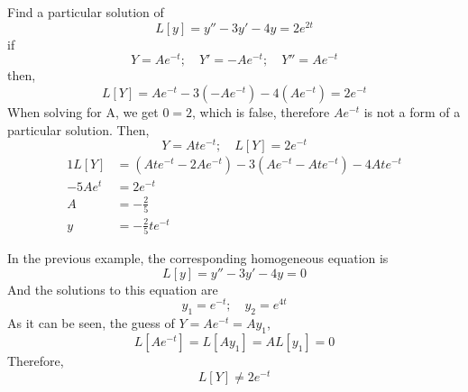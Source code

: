\documentclass[diffeq.tex]{subfiles}
\begin{document}
    \np
    \begin{example}
        Find a particular solution of
        \begin{equation}
            L[y] = y''- 3y' - 4y = 2e^{2t}
        \end{equation}
        if
        \begin{equation}
            Y = Ae^{-t};\quad Y' = -Ae^{-t};\quad Y'' = Ae^{-t}
        \end{equation}
        then,
        \begin{equation}
            L[Y] = Ae^{-t} - 3(-Ae^{-t}) - 4(Ae^{-t}) = 2e^{-t}
        \end{equation}
        When solving for A, we get $0 = 2$, which is false, therefore $Ae^{-t}$ is not a form of a particular solution.
        Then,
        \begin{equation}
            Y = Ate^{-t};\quad L[Y] = 2e^{-t}
        \end{equation}
        \begin{alignat}{1}
            L[Y] &= (Ate^{-t} - 2Ae^{-t})-3(Ae^{-t}-Ate^{-t}) - 4Ate^{-t}\\
            -5Ae^{t}&=2e^{-t}\\
            A &= -\frac{2}{5}\\
            y &= -\frac{2}{5}te^{-t}
        \end{alignat}
    \end{example}
    In the previous example, the corresponding homogeneous equation is
    \begin{equation}
        L[y] = y'' - 3y' - 4y = 0
    \end{equation}
    And the solutions to this equation are
    \begin{equation}
        y_{1} = e^{-t};\quad y_{2} = e^{4t}
    \end{equation}
    As it can be seen, the guess of $Y = Ae^{-t} = Ay_{1}$,
    \begin{equation}
        L[Ae^{-t}] = L[Ay_{1}] = AL[y_{1}] = 0
    \end{equation}
    Therefore,
    \begin{equation}
        L[Y] \neq 2e^{-t}
    \end{equation}
\end{document}
